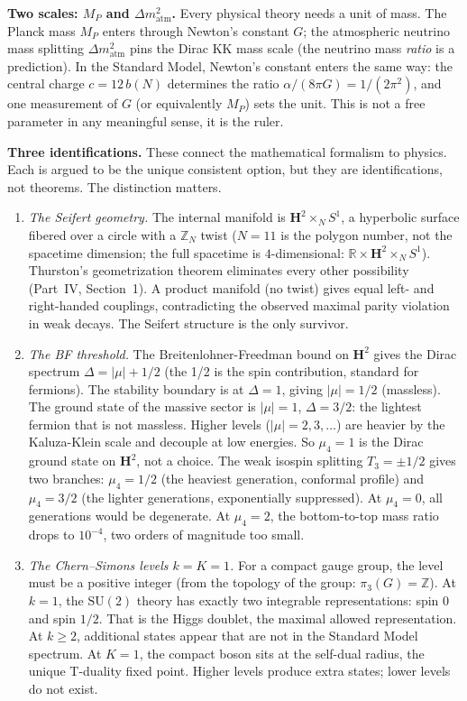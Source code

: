 \textbf{Two scales: $M_P$ and $\Delta m^2_{\mathrm{atm}}$.}
Every physical theory needs a unit of mass.
The Planck mass $M_P$ enters through Newton's constant $G$;
the atmospheric neutrino mass splitting
$\Delta m^2_{\mathrm{atm}}$ pins the Dirac KK mass scale
(the neutrino mass \emph{ratio} is a prediction).
In the Standard Model, Newton's constant enters the same way:
the central charge $c = 12\,b(N)$ determines the ratio
$\alpha/(8\pi G) = 1/(2\pi^2)$, and one measurement of $G$
(or equivalently $M_P$) sets the unit. This is
not a free parameter in any meaningful sense, it is the ruler.

\textbf{Three identifications.} These connect the mathematical formalism
to physics. Each is argued to be the unique consistent option, but they
are identifications, not theorems. The distinction matters.

\begin{enumerate}
\item \emph{The Seifert geometry.} The internal
  manifold is $\mathbf{H}^2 \times_N S^1$, a hyperbolic surface
  fibered over a circle with a $\mathbb{Z}_N$ twist
  ($N = 11$ is the polygon number, not the spacetime dimension;
  the full spacetime is $4$-dimensional:
  $\mathbb{R} \times \mathbf{H}^2 \times_N S^1$). Thurston's
  geometrization theorem eliminates every other possibility
  (Part~IV, Section~1). A product manifold (no twist) gives equal
  left- and right-handed couplings, contradicting the observed
  maximal parity violation in weak decays. The Seifert structure
  is the only survivor.

\item \emph{The BF threshold.} The Breitenlohner-Freedman bound on
  $\mathbf{H}^2$ gives the Dirac spectrum $\Delta = |\mu| + 1/2$
  (the 1/2 is the spin contribution, standard for fermions).
  The stability boundary is at $\Delta = 1$, giving $|\mu| = 1/2$
  (massless). The ground state of the massive sector is $|\mu| = 1$,
  $\Delta = 3/2$: the lightest fermion that is not massless.
  Higher levels ($|\mu| = 2, 3, \ldots$) are heavier by the
  Kaluza-Klein scale and decouple at low energies.
  So $\mu_4 = 1$ is the Dirac ground state on $\mathbf{H}^2$,
  not a choice.
  The weak isospin splitting $T_3 = \pm 1/2$ gives two
  branches: $\mu_4 = 1/2$ (the heaviest generation, conformal profile)
  and $\mu_4 = 3/2$ (the lighter generations, exponentially
  suppressed). At $\mu_4 = 0$, all
  generations would be degenerate. At $\mu_4 = 2$, the bottom-to-top
  mass ratio drops to $10^{-4}$, two orders of magnitude too small.

\item \emph{The Chern--Simons levels $k = K = 1$.} For a compact gauge
  group, the level must be a positive integer (from the topology of the
  group: $\pi_3(G) = \mathbb{Z}$). At $k = 1$, the $\mathrm{SU}(2)$
  theory has exactly two integrable representations: spin $0$ and spin
  $1/2$. That is the Higgs doublet, the maximal allowed representation.
  At $k \ge 2$, additional states appear that are not in the Standard
  Model spectrum. At $K = 1$, the compact boson sits at the self-dual
  radius, the unique T-duality fixed point. Higher levels produce extra
  states; lower levels do not exist.
\end{enumerate}

